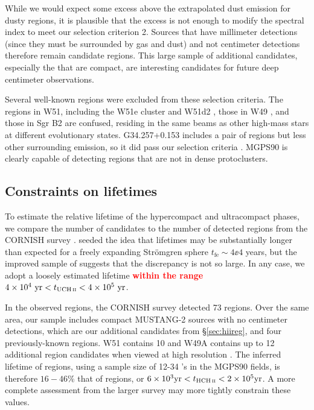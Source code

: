 \documentclass[twocolumn]{aastex62}
\def\change#1{{\textcolor{red}{\textbf{#1}}}}
\newcommand{\MGPS}{MGPS90\xspace}
\newcommand{\MUSTANG}{MUSTANG-2\xspace}
\begin{document}
While we would expect some excess above the extrapolated dust emission for
dusty \hchii regions, it is plausible that the excess is not enough to modify
the spectral index to meet our selection criterion 2.  Sources that have
millimeter detections (since they must be surrounded by gas and dust) and not
centimeter detections therefore remain candidate \hchii regions.  This large
sample of \mmdetectionscmnondetections additional candidates, especially the
\mmdetectionscmnondetectionscompact that are compact, are interesting
candidates for future deep centimeter observations.

Several well-known \hchii regions were excluded from these selection
criteria.  The \hchii regions in W51, including the W51e cluster and W51d2
\citep{Ginsburg2016a}, those in W49 \citep{De-Pree1997a}, and those in Sgr B2
\citep{De-Pree1998a} are confused, residing in the same beams as other
high-mass stars at different evolutionary states.  G34.257+0.153 includes a pair
of \hchii regions but less other surrounding emission, so it did pass our selection
criteria \citep{Sewilo2004a,Avalos2006a}.  MGPS90 is clearly capable of detecting
\hchii regions that are not in dense protoclusters.


\subsection{Constraints on \hchii lifetimes}
To estimate the relative lifetime of the hypercompact and ultracompact phases,
we compare the number of \hchii candidates to the number of detected \uchii
regions from the CORNISH survey \citep{Kalcheva2018a}.  \citet{Wood1989a}
seeded the idea that \uchii lifetimes may be substantially longer than expected
for a freely expanding Str\"omgren sphere $t_{\textrm{fe}} %
\sim 4\ee{4}$ years,
but the improved sample of \citet{Kalcheva2018a} suggests that the discrepancy
is not so large.  In any case, we adopt a loosely estimated \uchii lifetime
\change{within the range} $4\ee{4}~\mathrm{yr} < t_{\uchii} <
4\ee{5}~\mathrm{yr}$.

In the observed regions, the CORNISH survey detected 73 \uchii regions.  Over
the same area, our sample includes \mmdetectionscmnondetectionscompact compact
\MUSTANG sources with no centimeter detections, which are our additional
candidates from \S \ref{sec:hiireg}, and four previously-known \hchii regions.
W51 contains 10 and W49A contains up to 12 additional \hchii region candidates
when viewed at high resolution \citep{De-Pree1997a,Ginsburg2016a}.  The
inferred lifetime of \hchii regions, using a sample size of 12-34 \hchii's in
the \MGPS fields, is therefore $16-46\%$ that of \uchii regions, or $6\ee{3}
\mathrm{yr} < t_{\hchii} < 2\ee{5} \mathrm{yr}$.  A more complete assessment
from the larger survey may more tightly constrain these values.
\end{document}
